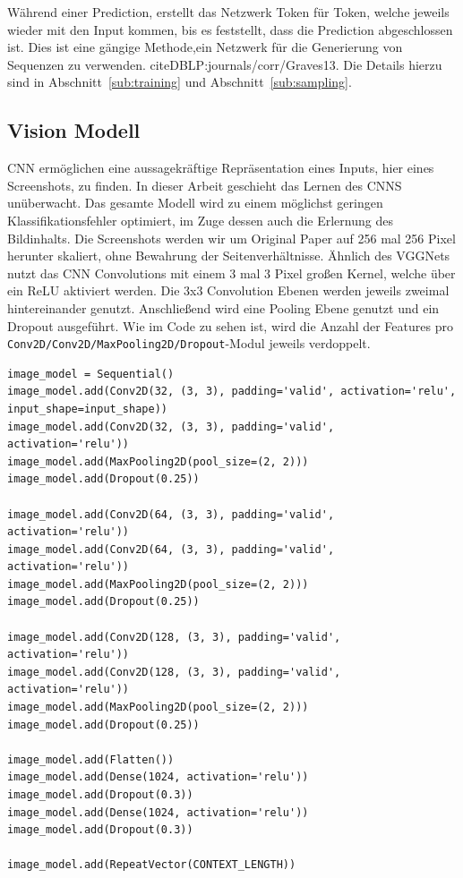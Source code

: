 \documentclass[pdftex,a4paper,halfparskip, article]{scrartcl}
\begin{document}
Während einer Prediction, erstellt das Netzwerk Token für Token, welche jeweils wieder mit den Input kommen, bis es feststellt, dass die Prediction abgeschlossen ist. Dies ist eine gängige Methode,ein Netzwerk für die Generierung von Sequenzen zu verwenden. cite{DBLP:journals/corr/Graves13}. Die Details hierzu sind in Abschnitt~\ref{sub:training} und Abschnitt~\ref{sub:sampling}. 


\subsection{Vision Modell}
 
CNN ermöglichen eine aussagekräftige Repräsentation eines Inputs, hier eines Screenshots, zu finden. In dieser Arbeit geschieht das Lernen des CNNS unüberwacht. Das gesamte Modell wird zu einem möglichst geringen Klassifikationsfehler  optimiert, im Zuge dessen auch die Erlernung des Bildinhalts. Die Screenshots werden wir um Original Paper auf 256 mal 256 Pixel herunter skaliert, ohne Bewahrung der Seitenverhältnisse. Ähnlich des VGGNets \cite{DBLP:journals/corr/SimonyanZ14a} nutzt das CNN Convolutions mit einem 3 mal 3 Pixel großen Kernel, welche über ein ReLU aktiviert werden. Die 3x3 Convolution Ebenen werden jeweils zweimal hintereinander genutzt. Anschließend wird eine Pooling Ebene genutzt und ein Dropout ausgeführt. Wie im Code zu sehen ist, wird die Anzahl der Features pro \texttt{Conv2D/Conv2D/MaxPooling2D/Dropout}-Modul jeweils verdoppelt.

\begin{verbatim}
image_model = Sequential()
image_model.add(Conv2D(32, (3, 3), padding='valid', activation='relu', 
input_shape=input_shape))
image_model.add(Conv2D(32, (3, 3), padding='valid', activation='relu')) 
image_model.add(MaxPooling2D(pool_size=(2, 2)))
image_model.add(Dropout(0.25))

image_model.add(Conv2D(64, (3, 3), padding='valid', activation='relu'))
image_model.add(Conv2D(64, (3, 3), padding='valid', activation='relu'))
image_model.add(MaxPooling2D(pool_size=(2, 2)))
image_model.add(Dropout(0.25))

image_model.add(Conv2D(128, (3, 3), padding='valid', activation='relu'))
image_model.add(Conv2D(128, (3, 3), padding='valid', activation='relu'))
image_model.add(MaxPooling2D(pool_size=(2, 2)))
image_model.add(Dropout(0.25))

image_model.add(Flatten())
image_model.add(Dense(1024, activation='relu'))
image_model.add(Dropout(0.3))
image_model.add(Dense(1024, activation='relu'))
image_model.add(Dropout(0.3))

image_model.add(RepeatVector(CONTEXT_LENGTH))
\end{verbatim}
\end{document}
